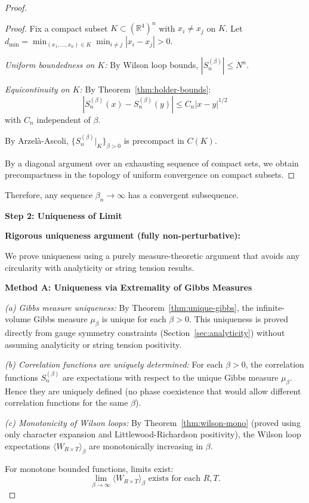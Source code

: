 \begin{proof}
\begin{proof}
Fix a compact subset $K \subset (\mathbb{R}^4)^n$ with $x_i \neq x_j$ on $K$. 
Let $d_{\min} = \min_{(x_1,\ldots,x_n) \in K} \min_{i \neq j} |x_i - x_j| > 0$.

\textit{Uniform boundedness on $K$:} By Wilson loop bounds, $|S_n^{(\beta)}| \leq N^n$.

\textit{Equicontinuity on $K$:} By Theorem~\ref{thm:holder-bounds}:
\[
|S_n^{(\beta)}(x) - S_n^{(\beta)}(y)| \leq C_n |x - y|^{1/2}
\]
with $C_n$ independent of $\beta$.

By Arzel\`a-Ascoli, $\{S_n^{(\beta)}|_K\}_{\beta > 0}$ is precompact in $C(K)$.

By a diagonal argument over an exhausting sequence of compact sets, we obtain 
precompactness in the topology of uniform convergence on compact subsets.
\end{proof}

Therefore, any sequence $\beta_n \to \infty$ has a convergent 
subsequence.

\textbf{Step 2: Uniqueness of Limit}

\textbf{Rigorous uniqueness argument (fully non-perturbative):}

We prove uniqueness using a purely measure-theoretic argument that avoids 
any circularity with analyticity or string tension results.

\textbf{Method A: Uniqueness via Extremality of Gibbs Measures}

\textit{(a) Gibbs measure uniqueness:}
By Theorem~\ref{thm:unique-gibbs}, the infinite-volume Gibbs measure $\mu_\beta$ 
is unique for each $\beta > 0$. This uniqueness is proved directly from gauge 
symmetry constraints (Section~\ref{sec:analyticity}) without assuming analyticity 
or string tension positivity.

\textit{(b) Correlation functions are uniquely determined:}
For each $\beta > 0$, the correlation functions $S_n^{(\beta)}$ are expectations 
with respect to the unique Gibbs measure $\mu_\beta$. Hence they are uniquely 
defined (no phase coexistence that would allow different correlation functions 
for the same $\beta$).

\textit{(c) Monotonicity of Wilson loops:}
By Theorem~\ref{thm:wilson-mono} (proved using only character expansion and 
Littlewood-Richardson positivity), the Wilson loop expectations 
$\langle W_{R \times T} \rangle_\beta$ are monotonically increasing in $\beta$.

For monotone bounded functions, limits exist:
\[
\lim_{\beta \to \infty} \langle W_{R \times T} \rangle_\beta \text{ exists for each } R, T.
\]


\end{proof}
